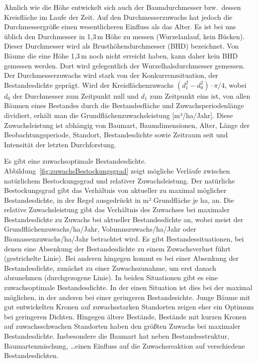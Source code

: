 \documentclass[twocolumn]{scrartcl}
\begin{document}
Ähnlich wie die Höhe entwickelt sich auch der Baumdurchmesser bzw.\ dessen
Kreisfläche im Laufe der Zeit. Auf den Durchmesserzuwachs hat jedoch die
Durchmessergröße einen wesentlicheren Einfluss als das Alter. Es ist bei uns
üblich den Durchmesser in 1,3\,m Höhe zu messen (Wurzelanlauf, kein Bücken).
Dieser Durchmesser wird als Brusthöhendurchmesser (BHD) bezeichnet. Von Bäume
die eine Höhe 1,3\,m noch nicht erreicht haben, kann daher kein BHD gemessen
werden. Dort wird gelegentlich der Wurzelhalsdurchmesser gemessen. Der
Durchmesserzuwachs wird stark von der Konkurrenzsituation, der Bestandesdichte
geprägt. Wird der Kreisflächenzuwachs $(d_1^2 - d_0^2)\cdot \pi/4$, wobei $d_0$
der Durchmesser zum Zeitpunkt null und $d_1$ zum Zeitpunkt eins ist, von allen
Bäumen eines Bestandes durch die Bestandesfläche und Zuwachsperiodenlänge
dividiert, erhält man die Grundflächenzuwachsleistung [m²/ha/Jahr]. Diese
Zuwachsleistung ist abhängig von Baumart, Baumdimensionen, Alter, Länge der
Beobachtungsperiode, Standort, Bestandesdichte sowie Zeitraum seit und
Intensität der letzten Durchforstung.

Es gibt eine zuwachsoptimale Bestandesdichte.
Abbildung~\ref{fig:zuwachsBestockungsgrad} zeigt mögliche Verläufe zwischen
natürlichem Bestockungsgrad und relativer Zuwachsleistung. Der natürliche
Bestockungsgrad gibt das Verhältnis von aktueller zu maximal möglicher
Bestandesdichte, in der Regel ausgedrückt in m² Grundfläche je ha, an. Die
relative Zuwachsleistung gibt das Verhältnis des Zuwachses bei maximaler
Bestandesdichte zu Zuwachs bei aktueller Bestandesdichte an, wobei meist der
Grundflächenzuwachs/ha/Jahr, Volumnszuwachs/ha/Jahr oder
Biomassenzuwachs/ha/Jahr betrachtet wird. Es gibt Bestandessituationen, bei
denen eine Absenkung der Bestandesdichte zu einem Zuwachsverlust führt
(gestrichelte Linie). Bei anderen hingegen kommt es bei einer Absenkung der
Bestandesdichte, zunächst zu einer Zuwachszunahme, um erst danach abzunehmen
(durchgezogene Linie). In beiden Situationen gibt es eine zuwachsoptimale
Bestandesdichte. In der einen Situation ist dies bei der maximal möglichen, in
der anderen bei einer geringeren Bestandesichte. Junge Bäume mit gut
entwickelten Kronen auf zuwachsstarken Standorten zeigen eher ein Optimum bei
geringeren Dichten. Hingegen ältere Bestände, Bestände mit kurzen Kronen auf
zuwachsschwachen Standorten haben den größten Zuwachs bei maximaler
Bestandesdichte. Insbesondere die Baumart hat neben Bestandesstruktur,
Baumartenmischung, \dots einen Einfluss auf die Zuwachsreaktion auf verschiedene
Bestandesdichten.
\end{document}
